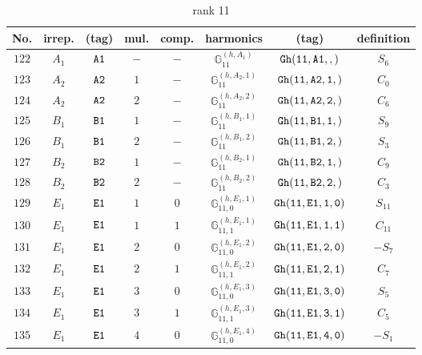 \documentclass[fleqn,8pt]{jsarticle}
\begin{document}
\begin{table}[ht!]
\begin{center}
\caption{rank 11}
\renewcommand{\arraystretch}{1.3}
\begin{tabular}{cccccccc} \hline \hline
No. & irrep. & (tag) & mul. & comp. & harmonics & (tag) & definition \\ \hline
$ 122 $ & $ A_{1} $ & $ {\tt A1} $ & $ - $ & $ - $ & $ \mathbb{G}_{11}^{(h,A_{1})} $ & $ {\tt Gh(11,A1,,)} $ & $ S_{6} $ \\
$ 123 $ & $ A_{2} $ & $ {\tt A2} $ & $ 1 $ & $ - $ & $ \mathbb{G}_{11}^{(h,A_{2},1)} $ & $ {\tt Gh(11,A2,1,)} $ & $ C_{0} $ \\
$ 124 $ & $ A_{2} $ & $ {\tt A2} $ & $ 2 $ & $ - $ & $ \mathbb{G}_{11}^{(h,A_{2},2)} $ & $ {\tt Gh(11,A2,2,)} $ & $ C_{6} $ \\
$ 125 $ & $ B_{1} $ & $ {\tt B1} $ & $ 1 $ & $ - $ & $ \mathbb{G}_{11}^{(h,B_{1},1)} $ & $ {\tt Gh(11,B1,1,)} $ & $ S_{9} $ \\
$ 126 $ & $ B_{1} $ & $ {\tt B1} $ & $ 2 $ & $ - $ & $ \mathbb{G}_{11}^{(h,B_{1},2)} $ & $ {\tt Gh(11,B1,2,)} $ & $ S_{3} $ \\
$ 127 $ & $ B_{2} $ & $ {\tt B2} $ & $ 1 $ & $ - $ & $ \mathbb{G}_{11}^{(h,B_{2},1)} $ & $ {\tt Gh(11,B2,1,)} $ & $ C_{9} $ \\
$ 128 $ & $ B_{2} $ & $ {\tt B2} $ & $ 2 $ & $ - $ & $ \mathbb{G}_{11}^{(h,B_{2},2)} $ & $ {\tt Gh(11,B2,2,)} $ & $ C_{3} $ \\
$ 129 $ & $ E_{1} $ & $ {\tt E1} $ & $ 1 $ & $ 0 $ & $ \mathbb{G}_{11,0}^{(h,E_{1},1)} $ & $ {\tt Gh(11,E1,1,0)} $ & $ S_{11} $ \\
$ 130 $ & $ E_{1} $ & $ {\tt E1} $ & $ 1 $ & $ 1 $ & $ \mathbb{G}_{11,1}^{(h,E_{1},1)} $ & $ {\tt Gh(11,E1,1,1)} $ & $ C_{11} $ \\
$ 131 $ & $ E_{1} $ & $ {\tt E1} $ & $ 2 $ & $ 0 $ & $ \mathbb{G}_{11,0}^{(h,E_{1},2)} $ & $ {\tt Gh(11,E1,2,0)} $ & $ - S_{7} $ \\
$ 132 $ & $ E_{1} $ & $ {\tt E1} $ & $ 2 $ & $ 1 $ & $ \mathbb{G}_{11,1}^{(h,E_{1},2)} $ & $ {\tt Gh(11,E1,2,1)} $ & $ C_{7} $ \\
$ 133 $ & $ E_{1} $ & $ {\tt E1} $ & $ 3 $ & $ 0 $ & $ \mathbb{G}_{11,0}^{(h,E_{1},3)} $ & $ {\tt Gh(11,E1,3,0)} $ & $ S_{5} $ \\
$ 134 $ & $ E_{1} $ & $ {\tt E1} $ & $ 3 $ & $ 1 $ & $ \mathbb{G}_{11,1}^{(h,E_{1},3)} $ & $ {\tt Gh(11,E1,3,1)} $ & $ C_{5} $ \\
$ 135 $ & $ E_{1} $ & $ {\tt E1} $ & $ 4 $ & $ 0 $ & $ \mathbb{G}_{11,0}^{(h,E_{1},4)} $ & $ {\tt Gh(11,E1,4,0)} $ & $ - S_{1} $ \\

\end{tabular}
\end{center}
\end{table}
\end{document}
